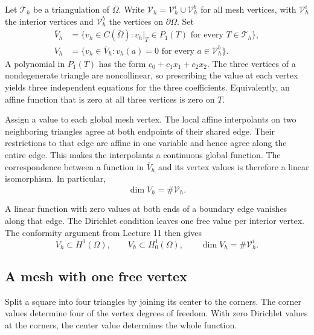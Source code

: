 \documentclass[11pt,a4paper]{article}
\begin{document}
Let \(\mathcal T_h\) be a triangulation of \(\overline\Omega\).
Write \(\mathcal V_h=\mathcal V_h^i\cup\mathcal V_h^b\) for all mesh vertices,
with \(\mathcal V_h^i\) the interior vertices and \(\mathcal V_h^b\) the
vertices on \(\partial\Omega\). Set
\[
 \begin{aligned}
  \overline V_h
    &=\{v_h\in C(\overline\Omega):
        v_h|_T\in P_1(T)\text{ for every }T\in\mathcal T_h\},\\
  V_h
    &=\{v_h\in \overline V_h:v_h(a)=0
        \text{ for every }a\in\mathcal V_h^b\}.
 \end{aligned}
\]
A polynomial in \(P_1(T)\) has the form \(c_0+c_1x_1+c_2x_2\).
The three vertices of a nondegenerate triangle are noncollinear, so
prescribing the value at each vertex yields three independent equations
for the three coefficients. Equivalently, an affine function that is
zero at all three vertices is zero on \(T\).

Assign a value to each global mesh vertex. The local affine interpolants
on two neighboring triangles agree at both endpoints of their shared edge.
Their restrictions to that edge are affine in one variable and hence
agree along the entire edge. This makes the interpolants a continuous
global function. The correspondence between a function in \(\overline V_h\)
and its vertex values is therefore a linear isomorphism. In particular,
\[
 \dim\overline V_h=\#\mathcal V_h.
\]

A linear function with zero values at both ends of a boundary edge
vanishes along that edge. The Dirichlet condition leaves one free value per interior vertex.
The conformity argument from Lecture 11 then gives
\[
 \overline V_h\subset H^1(\Omega),\qquad
 V_h\subset H_0^1(\Omega),\qquad
 \dim V_h=\#\mathcal V_h^i.
\]

\subsection{A mesh with one free vertex}

Split a square into four triangles by joining its center to the corners.
The corner values determine four of the vertex degrees of freedom.
With zero Dirichlet values at the corners, the center value determines
the whole function.

\begin{center}
\end{center}
\end{document}
